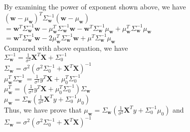 \documentclass{article}
\begin{document}
\noindent
By examining the power of exponent shown above, we have\\
\noindent
$(\textbf{w} - \mu_\textbf{w})^T\Sigma_\textbf{w}^{-1}(\textbf{w} - \mu_\textbf{w})$\\
$=\textbf{w}^T\Sigma_\textbf{w}^{-1}\textbf{w} - \mu_\textbf{w}^T\Sigma_\textbf{w}^{-1}\textbf{w} - \textbf{w}^T\Sigma_\textbf{w}^{-1}\mu_\textbf{w} + \mu_\textbf{w}^T\Sigma_\textbf{w}^{-1}\mu_\textbf{w}$\\
$=\textbf{w}^T\Sigma_\textbf{w}^{-1}\textbf{w} - 2\mu_\textbf{w}^T\Sigma_\textbf{w}^{-1}\textbf{w} + \mu^T\Sigma_\textbf{w}^{-1}\mu_\textbf{w}$\\
Compared with above equation, we have\\
$\Sigma_\textbf{w}^{-1} = \frac{1}{\sigma^2}\textbf{X}^T\textbf{X} + \Sigma_0^{-1}$ \\
$\Sigma_\textbf{w} = \sigma^2 (\sigma^2 \Sigma_0^{-1} + \textbf{X}^T\textbf{X})^{-1}$\\

\noindent
$\mu_\textbf{w}^T\Sigma_\textbf{w}^{-1} = \frac{1}{\sigma^2}y^T\textbf{X} + \mu_0^T\Sigma_0^{-1}$\\
$\mu_\textbf{w}^T = (\frac{1}{\sigma^2}y^T\textbf{X} + \mu_0^T\Sigma_0^{-1})\Sigma_\textbf{w}$\\
$\mu_\textbf{w} = \Sigma_\textbf{w}(\frac{1}{\sigma^2}\textbf{X}^Ty + \Sigma_0^{-1}\mu_0)$\\

\noindent
Thus, we have prove that $\mu_\textbf{w} = \Sigma_\textbf{w}(\frac{1}{\sigma^2}\textbf{X}^Ty + \Sigma_0^{-1}\mu_0)$ and $\Sigma_\textbf{w} = \sigma^2 (\sigma^2 \Sigma_0^{-1} + \textbf{X}^T\textbf{X})^{-1}$\\
\end{document}
